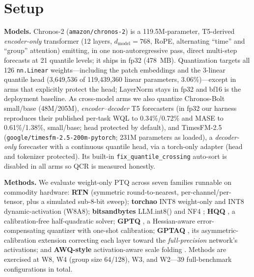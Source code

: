 \documentclass{article}
\begin{document}
\section{Setup}
\textbf{Models.} Chronos-2 \citep{chronos2} (\texttt{amazon/chronos-2}) is a
119.5M-parameter, T5-derived \emph{encoder-only} transformer (12 layers,
$d_{\text{model}}{=}768$, RoPE, alternating ``time'' and ``group'' attention) emitting, in
one non-autoregressive pass, direct multi-step forecasts at 21 quantile levels; it ships
in fp32 (478~MB). Quantization targets all 126 \texttt{nn.Linear} weights---including the
patch embeddings and the 3-linear quantile head (3{,}649{,}536 of 119{,}439{,}360 linear
parameters, 3.06\%)---except in arms that explicitly protect the head; LayerNorm stays in
fp32 and bf16 is the deployment baseline. As cross-model arms we also quantize
Chronos-Bolt small/base \citep{chronos} (48M/205M), \emph{encoder--decoder} T5 forecasters
(in fp32 our harness reproduces their published per-task WQL to 0.34\%/0.72\% and MASE to
0.61\%/1.38\%, small/base; head protected by default), and TimesFM-2.5
(\texttt{google/timesfm-2.5-200m-pytorch}; 231M parameters as loaded), a
\emph{decoder-only} forecaster with a continuous quantile head, via a torch-only adapter
(head and tokenizer protected). Its built-in \texttt{fix\_quantile\_crossing} auto-sort
is disabled in all arms so QCR is measured honestly.

\vspace{1pt}\noindent\textbf{Methods.} We evaluate weight-only PTQ across seven families
runnable on commodity hardware: \textbf{RTN} (symmetric round-to-nearest,
per-channel/per-tensor, plus a simulated sub-8-bit sweep); \textbf{torchao} INT8
weight-only and INT8 dynamic-activation (W8A8); \textbf{bitsandbytes} LLM.int8()
\citep{llmint8} and NF4 \citep{qlora}; \textbf{HQQ} \citep{hqq}, a calibration-free
half-quadratic solver; \textbf{GPTQ} \citep{gptq}, a Hessian-aware error-compensating
quantizer with one-shot calibration; \textbf{GPTAQ} \citep{gptaq}, its
asymmetric-calibration extension correcting each layer toward the \emph{full-precision}
network's activations; and \textbf{AWQ-style} activation-aware scale folding
\citep{awq}. Methods are exercised at W8, W4 (group size 64/128), W3, and W2---39
full-benchmark configurations in total.
\end{document}
